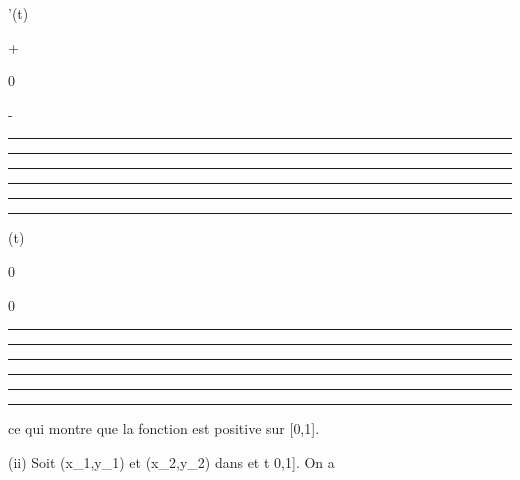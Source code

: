 \documentclass[]{article}
\begin{document}
\phi'(t)

+

0

-

\begin{center}\rule{3in}{0.4pt}\end{center}

\begin{center}\rule{3in}{0.4pt}\end{center}

\begin{center}\rule{3in}{0.4pt}\end{center}

\begin{center}\rule{3in}{0.4pt}\end{center}

\begin{center}\rule{3in}{0.4pt}\end{center}

\begin{center}\rule{3in}{0.4pt}\end{center}

\phi(t)

0

\nearrow

\searrow

0

\begin{center}\rule{3in}{0.4pt}\end{center}

\begin{center}\rule{3in}{0.4pt}\end{center}

\begin{center}\rule{3in}{0.4pt}\end{center}

\begin{center}\rule{3in}{0.4pt}\end{center}

\begin{center}\rule{3in}{0.4pt}\end{center}

\begin{center}\rule{3in}{0.4pt}\end{center}

ce qui montre que la fonction \phi est positive sur {[}0,1{]}.

(ii) Soit (x_1,y_1) et (x_2,y_2)
dans \Gamma et t \in {[}0,1{]}. On a
\end{document}
